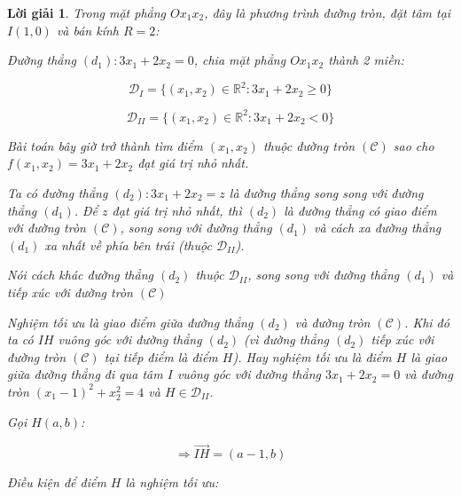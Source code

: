 \documentclass[14pt, a4paper]{article}
\theoremstyle{sltheorem}
\theoremstyle{soltheorem}
\newtheorem*{loigiai}{Lời giải}
\begin{document}
\begin{loigiai}
        Trong mặt phẳng $Ox_1 x_2$, đây là phương trình đường tròn, đặt tâm tại $I(1, 0)$ và bán kính $R=2$:

        Đường thẳng $(d_1): 3x_1 + 2x_2 = 0$, chia mặt phẳng $O x_1 x_2$ thành 2 miền:

        \begin{equation*}
            \mathcal{D}_I = \lbrace (x_1, x_2) \in \mathbb{R}^2: 3x_1 + 2x_2 \geq 0 \rbrace
        \end{equation*}

        \begin{equation*}
            \mathcal{D}_{II} = \lbrace (x_1, x_2) \in \mathbb{R}^2: 3x_1 + 2x_2 < 0 \rbrace
        \end{equation*}

        Bài toán bây giờ trở thành tìm điểm $(x_1, x_2)$ thuộc đường tròn $(\mathcal{C})$ sao cho $f(x_1, x_2)=3x_1+2x_2$ đạt giá trị nhỏ nhất.
        
        Ta có đường thẳng $(d_2): 3x_1 + 2x_2 =z$ là đường thẳng song song với đường thẳng $(d_1)$. 
        Để $z$ đạt giá trị nhỏ nhất, thì $(d_2)$ là đường thẳng có giao điểm với đường tròn $(\mathcal{C})$,
        song song với đường thẳng $(d_1)$ và cách xa đường thẳng $(d_1)$ xa nhất về phía bên trái (thuộc $\mathcal{D}_{II}$).

        Nói cách khác đường thẳng $(d_2)$ thuộc $\mathcal{D}_{II}$, song song với đường thẳng $(d_1)$ và tiếp xúc với đường tròn $(\mathcal{C})$

        Nghiệm tối ưu là giao điểm giữa đường thẳng $(d_2)$ và đường tròn $(\mathcal{C})$.
        Khi đó ta có $IH$ vuông góc với đường thẳng $(d_2)$ (vì đường thẳng $(d_2)$ tiếp xúc với đường tròn $(\mathcal{C})$ tại tiếp điểm là điểm $H$).
        Hay nghiệm tối ưu là điểm $H$ là giao giữa đường thẳng đi qua tâm $I$ vuông góc với đường thẳng $3x_1 + 2x_2 = 0$ và đường tròn $(x_1 - 1)^2 + x_2^2 = 4$ và $H \in \mathcal{D}_{II}$.

        Gọi $H(a, b)$:

        \begin{equation*}
            \Rightarrow \overrightarrow{IH}=(a - 1, b)
        \end{equation*}

        Điều kiện để điểm $H$ là nghiệm tối ưu:


\end{loigiai}
\end{document}
